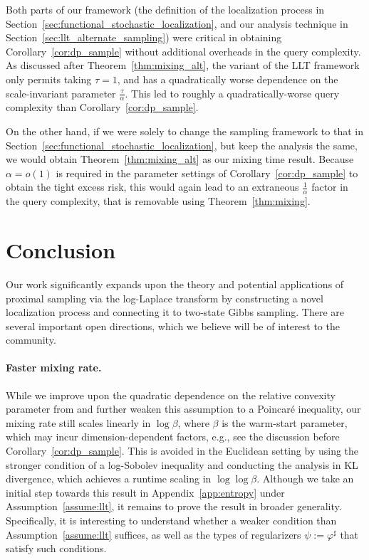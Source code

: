 \documentclass[11pt]{article}
\newcommand{\defeq}{:=}
\newcommand{\0}{\mathbf{0}}
\newcommand{\1}{\mathbf{1}}
\newcommand{\vhi}{\varphi}
\begin{document}
Both parts of our framework (the definition of the localization process in Section~\ref{sec:functional_stochastic_localization}, and our analysis technique in Section~\ref{sec:llt_alternate_sampling}) were critical in obtaining Corollary~\ref{cor:dp_sample} without additional overheads in the query complexity. As discussed after Theorem~\ref{thm:mixing_alt}, the \cite{GopiLLST25} variant of the LLT framework only permits taking $\tau = 1$, and has a quadratically worse dependence on the scale-invariant parameter $\frac \tau \alpha$. This led to roughly a quadratically-worse query complexity than Corollary~\ref{cor:dp_sample}. 

On the other hand, if we were solely to change the sampling framework to that in Section~\ref{sec:functional_stochastic_localization}, but keep the analysis the same, we would obtain Theorem~\ref{thm:mixing_alt} as our mixing time result. Because $\alpha = o(1)$ is required in the parameter settings of Corollary~\ref{cor:dp_sample} to obtain the tight excess risk, this would again lead to an extraneous $\frac 1 \alpha$ factor in the query complexity, that is removable using Theorem~\ref{thm:mixing}.
\section{Conclusion}\label{sec:conclusion}

Our work significantly expands upon the theory and potential applications of proximal sampling via the log-Laplace transform by constructing a novel localization process and connecting it to two-state Gibbs sampling. There are several important open directions, which we believe will be of interest to the community.


\paragraph{Faster mixing rate.} While we improve upon the quadratic dependence on the relative convexity parameter from \cite{GopiLLST25} and further weaken this assumption to a Poincar\'e inequality, our mixing rate still scales linearly in $\log \beta$, where $\beta$ is the warm-start parameter, which may incur dimension-dependent factors, e.g., see the discussion before Corollary~\ref{cor:dp_sample}. This is avoided in the Euclidean setting by using the stronger condition of a log-Sobolev inequality and conducting the analysis in KL divergence, which achieves a runtime scaling in $\log\log \beta$. 
Although we take an initial step towards this result in Appendix~\ref{app:entropy} under Assumption~\ref{assume:llt}, it remains to prove the result in broader generality. Specifically, it is interesting to understand whether a weaker condition than Assumption~\ref{assume:llt} suffices, as well as the types of regularizers $\psi \defeq \vhi^\sharp$ that satisfy such conditions.
\end{document}
